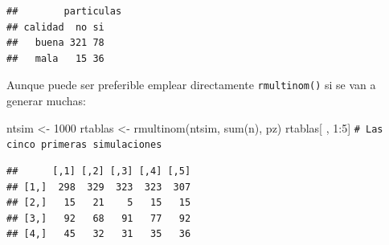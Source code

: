 \documentclass[
]{book}
\newenvironment{Shaded}{\begin{snugshade}}{\end{snugshade}}
\newcommand{\CommentTok}[1]{\textcolor[rgb]{0.56,0.35,0.01}{\textit{#1}}}
\newcommand{\DecValTok}[1]{\textcolor[rgb]{0.00,0.00,0.81}{#1}}
\newcommand{\FunctionTok}[1]{\textcolor[rgb]{0.00,0.00,0.00}{#1}}
\newcommand{\NormalTok}[1]{#1}
\newcommand{\OtherTok}[1]{\textcolor[rgb]{0.56,0.35,0.01}{#1}}
\newcommand{\SpecialCharTok}[1]{\textcolor[rgb]{0.00,0.00,0.00}{#1}}
\theoremstyle{break}
\theoremstyle{nonumberplain}
\renewcommand{\CommentTok}[1]{\textcolor[rgb]{0.41,0.41,0.41}{\texttt{#1}}}
\begin{document}
\begin{verbatim}
##        particulas
## calidad  no si
##   buena 321 78
##   mala   15 36
\end{verbatim}

Aunque puede ser preferible emplear directamente \texttt{rmultinom()} si se van a generar muchas:

\begin{Shaded}
\begin{Highlighting}[]
\NormalTok{ntsim }\OtherTok{\textless{}{-}} \DecValTok{1000}
\NormalTok{rtablas }\OtherTok{\textless{}{-}} \FunctionTok{rmultinom}\NormalTok{(ntsim, }\FunctionTok{sum}\NormalTok{(n), pz)}
\NormalTok{rtablas[ , }\DecValTok{1}\SpecialCharTok{:}\DecValTok{5}\NormalTok{] }\CommentTok{\# Las cinco primeras simulaciones}
\end{Highlighting}
\end{Shaded}

\begin{verbatim}
##      [,1] [,2] [,3] [,4] [,5]
## [1,]  298  329  323  323  307
## [2,]   15   21    5   15   15
## [3,]   92   68   91   77   92
## [4,]   45   32   31   35   36
\end{verbatim}
\end{document}
